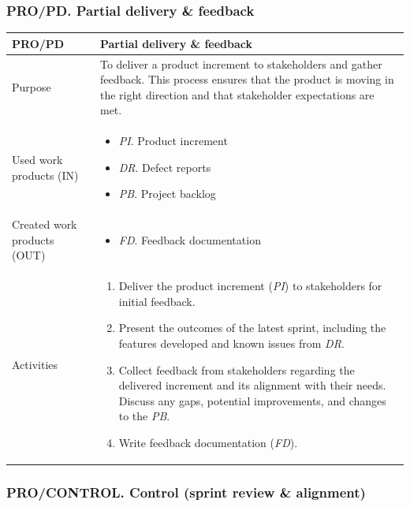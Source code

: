 \newpage
\subsubsection{PRO/PD. Partial delivery \& feedback}

\begin{table}[h!]
\begin{tabular}{l|p{}}
\hline
\textbf{PRO/PD}        & \textbf{Partial delivery \& feedback} \\ \hline
Purpose & To deliver a  product increment to stakeholders and gather feedback. This process ensures that the product is moving in the right direction and that stakeholder expectations are met. \\ \hline
Used work products (IN)    &      
\begin{itemize}
    \item \textit{PI}. Product increment
    \item \textit{DR}. Defect reports
    \item \textit{PB}. Project backlog
\end{itemize}
\\ \hline
Created work products (OUT) &     
\begin{itemize}
    \item \textit{FD}. Feedback documentation
\end{itemize}
\\ \hline
Activities            &   
\begin{enumerate}
    \item Deliver the product increment (\textit{PI}) to stakeholders for initial feedback.
    \item Present the outcomes of the latest sprint, including the features developed and known issues from \textit{DR}.
    \item Collect feedback from stakeholders regarding the delivered increment and its alignment with their needs. Discuss any gaps, potential improvements, and changes to the     \textit{PB}.
    \item Write feedback documentation (\textit{FD}).
\end{enumerate}
\end{tabular}
\label{partial_delivery_feedback_alignment}
\end{table}

\newpage
\subsubsection{PRO/CONTROL. Control (sprint review \& alignment)}

